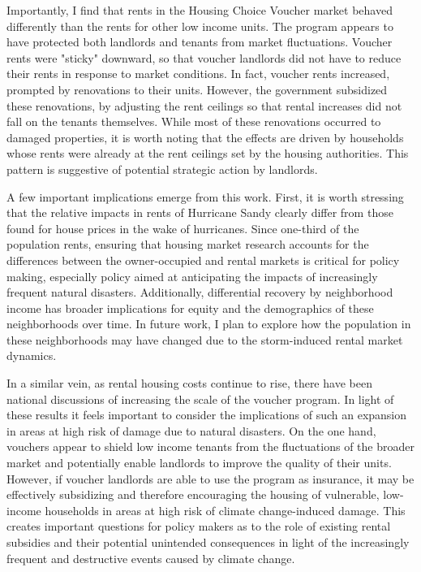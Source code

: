 \documentclass[12pt]{article}
\begin{document}
{{{{{{Importantly, I find that rents in the Housing Choice Voucher market behaved differently than the rents for other low income units. The program appears to have protected both landlords and tenants from market fluctuations.  Voucher rents were "sticky" downward, so that voucher landlords did not have to reduce their rents in response to market conditions.  In fact, voucher rents increased, prompted by renovations to their units.  However, the government subsidized these renovations, by adjusting the rent ceilings so that rental increases did not fall on the tenants themselves. While most of these renovations occurred to damaged properties, it is worth noting that the effects are driven by households whose rents were already at the rent ceilings set by the housing authorities.  This pattern is suggestive of potential strategic action by landlords.

A few important implications emerge from this work.  First, it is worth stressing that the relative impacts in rents of Hurricane Sandy clearly differ from those found for house prices in the wake of hurricanes.  Since one-third of the population rents, ensuring that housing market research accounts for the differences between the owner-occupied and rental markets is critical for policy making, especially policy aimed at anticipating the impacts of increasingly frequent natural disasters.  Additionally, differential recovery by neighborhood income has broader implications for equity and the demographics of these neighborhoods over time. In future work, I plan to explore how the population in these neighborhoods may have changed due to the storm-induced rental market dynamics. 

In a similar vein, as rental housing costs continue to rise, there have been national discussions of increasing the scale of the voucher program. In light of these results it feels important to consider the implications of such an expansion in areas at high risk of damage due to natural disasters.  On the one hand, vouchers appear to shield low income tenants from the fluctuations of the broader market and potentially enable landlords to improve the quality of their units.  However, if voucher landlords are able to use the program as insurance, it may be effectively subsidizing and therefore encouraging the housing of vulnerable, low-income households in areas at high risk of climate change-induced damage. This creates important questions for policy makers as to the role of existing rental subsidies and their potential unintended consequences in light of the increasingly frequent and destructive events caused by climate change.


}}}}}}
\end{document}
